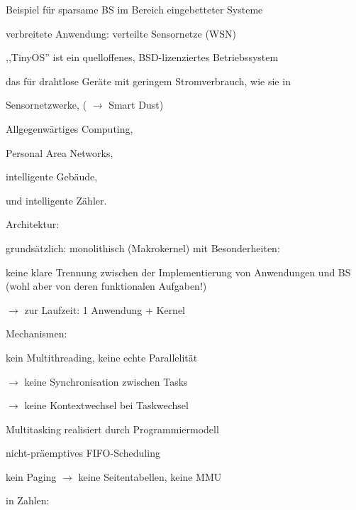 \documentclass[a4paper]{article}
\begin{document}
\begin{multicols}{3}
    \begin{itemize*}
        \item Beispiel für sparsame BS im Bereich eingebetteter Systeme
        \item verbreitete Anwendung: verteilte Sensornetze (WSN)
        \item ,,TinyOS'' ist ein quelloffenes, BSD-lizenziertes Betriebssystem
        \item das für drahtlose Geräte mit geringem Stromverbrauch, wie sie in
        \begin{itemize*}
            \item Sensornetzwerke, ( $\rightarrow$ Smart Dust)
            \item Allgegenwärtiges Computing,
            \item Personal Area Networks,
            \item intelligente Gebäude,
            \item und intelligente Zähler.
        \end{itemize*}
        \item
        Architektur:
        \begin{itemize*}
            \item grundsätzlich: monolithisch (Makrokernel) mit Besonderheiten:
            \item keine klare Trennung zwischen der Implementierung von Anwendungen und BS (wohl aber von deren funktionalen Aufgaben!)
            \item $\rightarrow$ zur Laufzeit: 1 Anwendung + Kernel
        \end{itemize*}
        \item
        Mechanismen:
        \begin{itemize*}
            \item kein Multithreading, keine echte Parallelität
            \item $\rightarrow$ keine Synchronisation zwischen Tasks
            \item $\rightarrow$ keine Kontextwechsel bei Taskwechsel
            \item Multitasking realisiert durch Programmiermodell
            \item nicht-präemptives FIFO-Scheduling
            \item kein Paging $\rightarrow$ keine Seitentabellen, keine MMU
        \end{itemize*}
        \item
        in Zahlen:
        \begin{itemize*}

\end{itemize*}
\end{itemize*}
\end{multicols}
\end{document}
